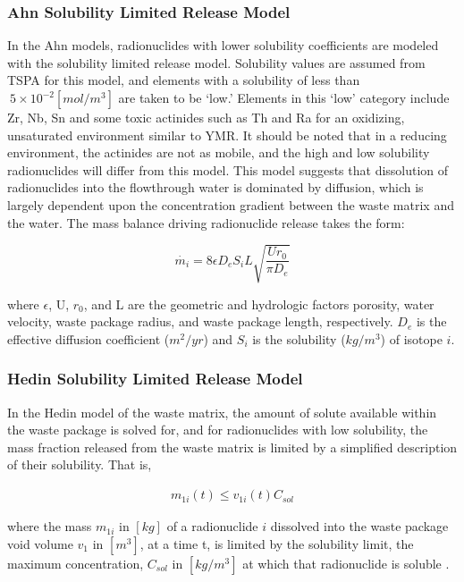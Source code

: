\subsubsection{Ahn Solubility Limited Release Model}

In the Ahn models, radionuclides with lower solubility coefficients are modeled with
the solubility limited release model.  Solubility values are assumed from TSPA
for this model, and elements with a solubility of less than $~5\times 10^{-2}
[mol/m^3]$ are taken to be
`low.' Elements in this `low' category include Zr, Nb, Sn and some toxic actinides 
such as Th and Ra for an oxidizing, unsaturated environment similar to \gls{YMR}.
It should be noted that in a reducing environment, the actinides are not as mobile, 
and the high and low solubility radionuclides will differ from this model.
This model suggests that dissolution of radionuclides into the flowthrough water 
is dominated by diffusion, which is largely dependent upon the concentration 
gradient between the waste matrix and the water. The mass balance driving 
radionuclide release takes the form:

\begin{equation}
 \dot{m_i}=8\epsilon D_eS_iL\sqrt{\frac{Ur_0}{\pi D_e}}
\end{equation} 

where $\epsilon$, U, $r_0$, and L are the geometric and
hydrologic factors porosity, water velocity, waste package radius, and waste
package length, respectively. $D_e$ is the effective diffusion coefficient
($m^2/yr$)  and $S_i$ is the solubility ($kg/m^3$) of isotope $i$.


\subsubsection{Hedin Solubility Limited Release Model}

In the Hedin model of the waste matrix, the amount of solute available within
the waste package is solved for, and for radionuclides with low solubility, the mass
fraction released from the waste matrix is limited by a simplified description
of their solubility. That is, 

\begin{align} 
  m_{1i}(t)\le v_{1i}(t)C_{sol}
\end{align}

where the mass $m_{1i}$ in $[kg]$ of a radionuclide $i$ dissolved into the waste package
void volume $v_1$ in $[m^3]$, at a time t, is limited by the solubility limit, 
the maximum concentration, $C_{sol}$ in $[kg/m^3]$ at which that radionuclide is 
soluble \cite{hedin_integrated_2002}.

